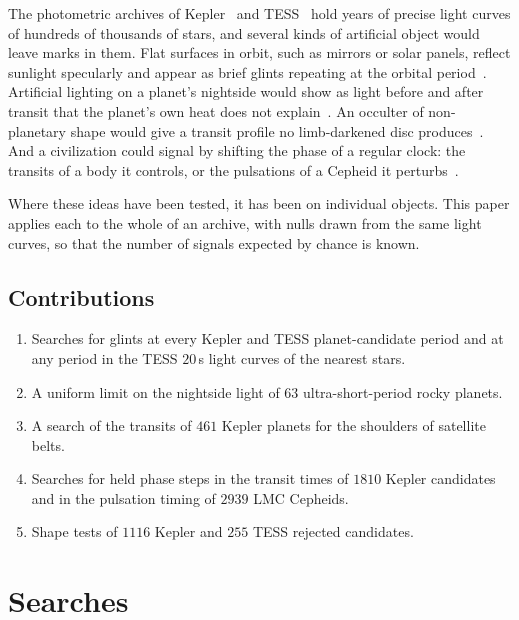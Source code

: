 \documentclass[3p,11pt]{elsarticle}
\begin{document}
The photometric archives of Kepler~\cite{Borucki2010} and TESS~\cite{Ricker2015} hold
years of precise light curves of hundreds of thousands of stars, and several kinds of
artificial object would leave marks in them. Flat surfaces in orbit, such as mirrors or
solar panels, reflect sunlight specularly and appear as brief glints repeating at the
orbital period~\cite{Jaiswal2023}. Artificial lighting on a planet's nightside would
show as light before and after transit that the planet's own heat does not
explain~\cite{LoebTurner2012}. An occulter of non-planetary shape would give a transit
profile no limb-darkened disc produces~\cite{Arnold2005,Wright2016}. And a civilization
could signal by shifting the phase of a regular clock: the transits of a body it
controls, or the pulsations of a Cepheid it perturbs~\cite{Learned2012}.

Where these ideas have been tested, it has been on individual objects. This paper
applies each to the whole of an archive, with nulls drawn from the same light curves,
so that the number of signals expected by chance is known.

\subsection{Contributions}
\begin{enumerate}[leftmargin=*,itemsep=1pt]
\item Searches for glints at every Kepler and TESS planet-candidate period and at any
period in the TESS $20$\,s light curves of the nearest stars.
\item A uniform limit on the nightside light of $63$ ultra-short-period rocky planets.
\item A search of the transits of $461$ Kepler planets for the shoulders of satellite
belts.
\item Searches for held phase steps in the transit times of $1810$ Kepler candidates and
in the pulsation timing of $2939$ LMC Cepheids.
\item Shape tests of $1116$ Kepler and $255$ TESS rejected candidates.
\end{enumerate}

\section{Searches}\label{sec:searches}
\end{document}
